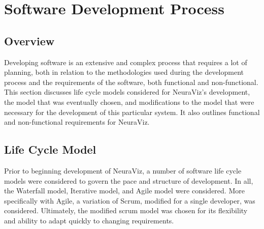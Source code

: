\section{Software Development Process}
\label{sec:SoftwareDevelopmentProcess}

\subsection{Overview} 
Developing software is an extensive and complex process that requires a lot of planning, both in relation to the methodologies used during the development process and the requirements of the software, both functional and non-functional. This section discusses life cycle models considered for NeuraViz's development, the model that was eventually chosen, and modifications to the model that were necessary for the development of this particular system. It also outlines functional and non-functional requirements for NeuraViz.

\subsection{Life Cycle Model}
Prior to beginning development of NeuraViz, a number of software life cycle models were considered to govern the pace and structure of development. In all, the Waterfall model, Iterative model, and Agile model were considered. More specifically with Agile, a variation of Scrum, modified for a single developer, was considered. Ultimately, the modified scrum model was chosen for its flexibility and ability to adapt quickly to changing requirements.

